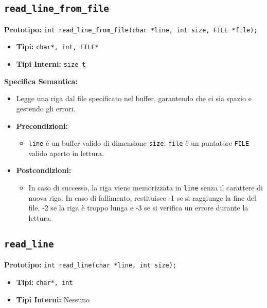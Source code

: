 \documentclass{article}
\begin{document}
\subsection{\texttt{read\_line\_from\_file}}
\textbf{Prototipo:} \texttt{int read\_line\_from\_file(char *line, int size, FILE *file);}

\begin{itemize}[label=--,leftmargin=*]
    \item \textbf{Tipi:} \texttt{char*, int, FILE*}
    \item \textbf{Tipi Interni:} \texttt{size\_t}
\end{itemize}

\flushleft
\textbf{Specifica Semantica:}
\begin{itemize}[label=--,leftmargin=*]
    \item Legge una riga dal file specificato nel buffer, garantendo che ci sia spazio e gestendo gli errori.
    \item \textbf{Precondizioni:}
    \begin{itemize}[label=--,leftmargin=*]
        \item \texttt{line} è un buffer valido di dimensione \texttt{size}. \texttt{file} è un puntatore \texttt{FILE} valido aperto in lettura.
    \end{itemize}
    \item \textbf{Postcondizioni:}
    \begin{itemize}[label=--,leftmargin=*]
        \item In caso di successo, la riga viene memorizzata in \texttt{line} senza il carattere di nuova riga. In caso di fallimento, restituisce -1 se si raggiunge la fine del file, -2 se la riga è troppo lunga e -3 se si verifica un errore durante la lettura.
    \end{itemize}
\end{itemize}


\subsection{\texttt{read\_line}}
\textbf{Prototipo:} \texttt{int read\_line(char *line, int size);}

\begin{itemize}[label=--,leftmargin=*]
    \item \textbf{Tipi:} \texttt{char*, int}
    \item \textbf{Tipi Interni:} Nessuno
\end{itemize}
\end{document}
